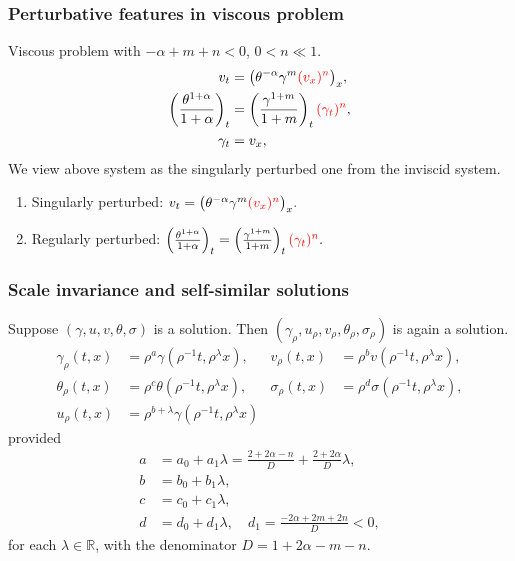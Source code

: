\documentclass{beamer}
\def\red{\color{red}}
\begin{document}
\begin{frame}
 \frametitle{Perturbative features in viscous problem}
 Viscous problem with {\scriptsize {\red $-\alpha +m+n<0$}, $0<n\ll1$.}
 \begin{align*}
  v_t &= \big(\theta^{-\alpha}\gamma^m {\red (v_x)^n}\big)_x,\\
  \left(\frac{\theta^{1+\alpha}}{1+\alpha}\right)_t &= \left(\frac{\gamma^{1+m}}{1+m}\right)_t{\red (\gamma_t)^n},\\
  \gamma_t&=v_x,
 \end{align*}
 We view above system as the singularly perturbed one from the inviscid system.
  \vfill
 \begin{enumerate}
  \item Singularly perturbed:
  $v_t = \big(\theta^{-\alpha}\gamma^m {\red (v_x)^n}\big)_x.$
  \item Regularly perturbed:
  $ \left(\frac{\theta^{1+\alpha}}{1+\alpha}\right)_t = \left(\frac{\gamma^{1+m}}{1+m}\right)_t{\red (\gamma_t)^n}.$
 \end{enumerate}
\end{frame}

\begin{frame}
 \frametitle{Scale invariance and self-similar solutions}
 Suppose $(\gamma,u,v,\theta,\sigma)$ is a solution. Then $(\gamma_\rho,u_\rho,v_\rho,\theta_\rho,\sigma_\rho)$ is again a solution.
\begin{equation}\label{eq:scale}
\begin{aligned}
 \gamma_\rho(t,x) &= \rho^a\gamma(\rho^{-1}t,\rho^\lambda x), &
 v_\rho(t,x) &= \rho^bv(\rho^{-1}t,\rho^\lambda x),\\
 \theta_\rho(t,x) &= \rho^c\theta(\rho^{-1}t,\rho^\lambda x), &
 \sigma_\rho(t,x) &= \rho^d\sigma(\rho^{-1}t,\rho^\lambda x),\\
 u_\rho(t,x) &= \rho^{b+\lambda}\gamma(\rho^{-1}t,\rho^\lambda x)
\end{aligned}
\end{equation}
provided{\scriptsize
\begin{equation} \label{eq:exponents}
\begin{aligned}
 a&= a_0 + a_1 \lambda=\frac{2+2\alpha-n}{D} + \frac{2+2\alpha}{D}\lambda, \\ b&=b_0 + b_1\lambda,\\%
 c&=c_0 + c_1\lambda,\\%
 d&=d_0 + d_1\lambda, \quad d_1 = \frac{-2\alpha+2m+2n}{D}<0,%
\end{aligned}
\end{equation}}
for each $\lambda \in \mathbb{R}$, with the denominator $D = 1+2\alpha-m-n$.
\end{frame}
\end{document}
